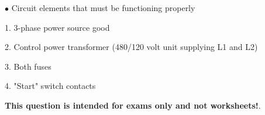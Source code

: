 \medskip
\goodbreak
\item{$\bullet$} Circuit elements that must be functioning properly
\item{1.} 3-phase power source good
\item{2.} Control power transformer (480/120 volt unit supplying L1 and L2)
\item{3.} Both fuses
\item{4.} "Start" switch contacts
\medskip







{\bf This question is intended for exams only and not worksheets!}.




